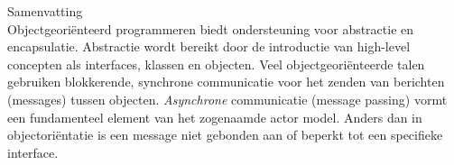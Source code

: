 \vspace*{20mm}

{Samenvatting}\label{sec:abstract-diff} \\

Objectgeori\"{e}nteerd programmeren biedt ondersteuning voor abstractie en encapsulatie.
Abstractie wordt bereikt door de introductie van high-level concepten als interfaces, klassen en objecten.
Veel objectgeori\"{e}nteerde talen gebruiken blokkerende, synchrone communicatie voor het zenden van berichten (messages) tussen objecten.
\emph{Asynchrone} communicatie (message passing) vormt een fundamenteel element van het zogenaamde actor model.
Anders dan in objectori\"{e}ntatie is een message niet gebonden aan of beperkt tot een specifieke interface.

